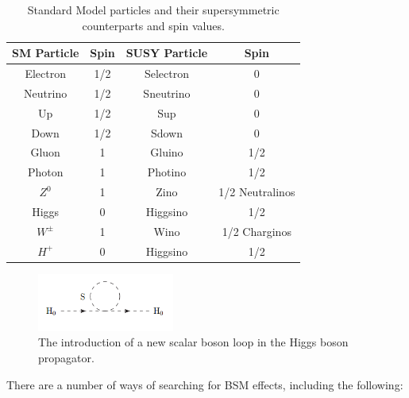 \begin{table}
\begin{center}
\begin{tabular}{cccc}
\hline
\hline
\textbf{SM Particle} & \textbf{Spin} & \textbf{SUSY Particle} & \textbf{Spin} \\
\hline
Electron & 1/2 & Selectron & 0 \\
Neutrino & 1/2 & Sneutrino & 0 \\
Up & 1/2 & Sup & 0 \\
Down & 1/2 & Sdown & 0 \\
\hline
Gluon & 1 & Gluino & 1/2 \\
\hline 
Photon & 1 & Photino & 1/2 \\
$Z^0$ & 1 & Zino & 1/2 Neutralinos \\
Higgs & 0 & Higgsino & 1/2 \\
\hline
$W^{\pm}$ & 1 & Wino & 1/2 Charginos \\
$H^+$ & 0 & Higgsino & 1/2 \\
\hline
\hline
\end{tabular}
\end{center}
\caption{Standard Model particles and their supersymmetric counterparts and spin values.}
\label{tab-SUSYParticles}
\end{table}

\begin{figure}
\begin{center}
\includegraphics[width=0.4\textwidth]{Figures/SUSYHiggs.png}
\end{center}
\caption{The introduction of a new scalar boson loop in the Higgs boson propagator.}
\label{fig-SUSYHiggs}
\end{figure}

There are a number of ways of searching for BSM effects, including the following:

